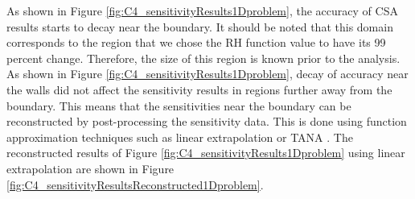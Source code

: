 As shown in Figure \ref{fig:C4_sensitivityResults1Dproblem}, the accuracy of CSA results starts to decay near the boundary. It should be noted that this domain corresponds to the region that we chose the RH function value to have its 99 percent change. Therefore, the size of this region is known prior to the analysis. As shown in Figure \ref{fig:C4_sensitivityResults1Dproblem}, decay of accuracy near the walls did not affect the sensitivity results in regions further away from the boundary. This means that the sensitivities near the boundary can be reconstructed by post-processing the sensitivity data. This is done using function approximation techniques such as linear extrapolation or TANA \cite{wang1995improved}. The reconstructed results of Figure \ref{fig:C4_sensitivityResults1Dproblem} using linear extrapolation are shown in Figure \ref{fig:C4_sensitivityResultsReconstructed1Dproblem}.

